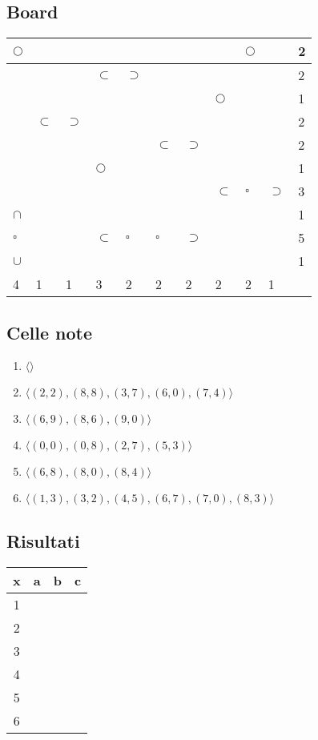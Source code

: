 \documentclass[11pt]{article}
\begin{document}
\subsection{Board}
\begin{table}[H]
    \begin{tabular}{|l|l|l|l|l|l|l|l|l|l||l|}
    \hline
     $\Circle$ &  &  &  &  &  &  &  & $\Circle$ &  & 2 \\ \hline
     &  &  & $\subset$ & $\supset$ &  &  &  &  &  & 2 \\ \hline
     &  &  &  &  &  &  & $\Circle$ &  &  & 1 \\ \hline
     & $\subset$ & $\supset$ &  &  &  &  &  &  &  & 2 \\ \hline
     &  &  &  &  & $\subset$ & $\supset$ &  &  &  & 2 \\ \hline
     &  &  & $\Circle$ &  &  &  &  &  &  & 1 \\ \hline
     &  &  &  &  &  &  & $\subset$ & $\square$ & $\supset$ & 3 \\ \hline
     $\cap$ &  &  &  &  &  &  &  &  &  & 1 \\ \hline
     $\square$ &  &  & $\subset$ & $\square$ & $\square$ & $\supset$ &  &  &  & 5 \\ \hline
     $\cup$ &  &  &  &  &  &  &  &  &  & 1 \\ \hline \hline
     4 & 1 & 1 & 3 & 2 & 2 & 2 & 2 & 2 & 1 & \\ \hline
    \end{tabular}
\end{table}

\subsection{Celle note}
\begin{enumerate}
    \item $\langle \rangle$
    \item $\langle (2, 2), (8, 8), (3, 7), (6, 0), (7, 4) \rangle$
    \item $\langle (6, 9), (8, 6), (9, 0) \rangle$
    \item $\langle (0, 0), (0, 8), (2, 7), (5, 3) \rangle$
    \item $\langle (6, 8), (8, 0), (8, 4) \rangle$
    \item $\langle (1, 3), (3, 2), (4, 5), (6, 7), (7, 0), (8, 3) \rangle$
\end{enumerate}

\subsection{Risultati}
\begin{table}[H]
    \begin{tabular}{|c|c|c|c|}
    \hline
    x & a & b & c \\ \hline \hline
    1 &  &  &  \\ \hline
    2 &  &  &  \\ \hline
    3 &  &  &  \\ \hline
    4 &  &  &  \\ \hline
    5 &  &  &  \\ \hline
    6 &  &  &  \\ \hline
    \end{tabular}
\end{table}
\end{document}
